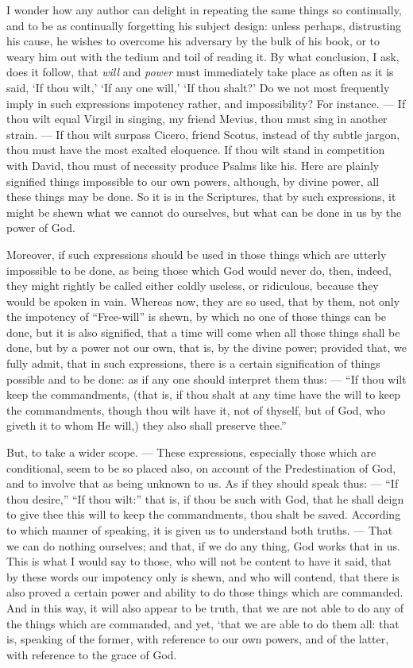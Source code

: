 I wonder how any author can delight in repeating the same things so continually, and to be as continually forgetting his subject design: unless perhaps, distrusting his cause, he wishes to overcome his adversary by the bulk of his book, or to weary him out with the tedium and toil of reading it. By what conclusion, I ask, does it follow, that \emph{will }and \emph{power }must immediately take place as often as it is said, ‘If thou wilt,’ ‘If any one will,’ ‘If thou shalt?’ Do we not most frequently imply in such expressions impotency rather, and impossibility? For instance. — If thou wilt equal Virgil in singing, my friend Mevius, thou must sing in another strain. — If thou wilt surpass Cicero, friend Scotus, instead of thy subtle jargon, thou must have the most exalted eloquence. If thou wilt stand in competition with David, thou must of necessity produce Psalms like his. Here are plainly signified things impossible to our own powers, although, by divine power, all these things may be done. So it is in the Scriptures, that by such expressions, it might be shewn what we cannot do ourselves, but what can be done in us by the power of God.

Moreover, if such expressions should be used in those things which are utterly impossible to be done, as being those which God would never do, then, indeed, they might rightly be called either coldly useless, or ridiculous, because they would be spoken in vain. Whereas now, they are so used, that by them, not only the impotency of “Free-will” is shewn, by which no one of those things can be done, but it is also signified, that a time will come when all those things shall be done, but by a power not our own, that is, by the divine power; provided that, we fully admit, that in such expressions, there is a certain signification of things possible and to be done: as if any one should interpret them thus: — “If thou wilt keep the commandments, (that is, if thou shalt at any time have the will to keep the commandments, though thou wilt have it, not of thyself, but of God, who giveth it to whom He will,) they also shall preserve thee.”

But, to take a wider scope. — These expressions, especially those which are conditional, seem to be so placed also, on account of the Predestination of God, and to involve that as being unknown to us. As if they should speak thus: — “If thou desire,” “If thou wilt:” that is, if thou be such with God, that he shall deign to give thee this will to keep the commandments, thou shalt be saved. According to which manner of speaking, it is given us to understand both truths. — That we can do nothing ourselves; and that, if we do any thing, God works that in us. This is what I would say to those, who will not be content to have it said, that by these words our impotency only is shewn, and who will contend, that there is also proved a certain power and ability to do those things which are commanded. And in this way, it will also appear to be truth, that we are not able to do any of the things which are commanded, and yet, ‘that we are able to do them all: that is, speaking of the former, with reference to our own powers, and of the latter, with reference to the grace of God.

